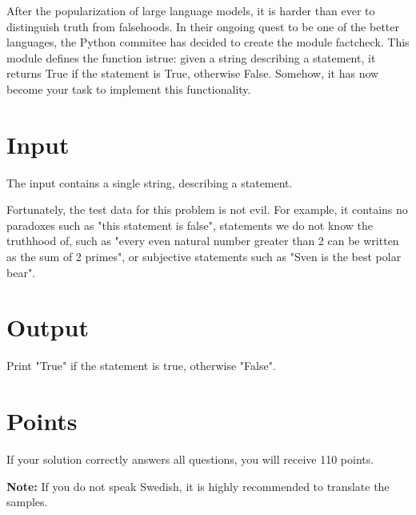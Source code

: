 \noindent

After the popularization of large language models, it is harder than ever to distinguish
truth from falsehoods. In their ongoing quest to be one of the better languages,
the Python commitee has decided to create the module factcheck. This module defines
the function istrue: given a string describing a statement, it returns True if the
statement is True, otherwise False. Somehow, it has now become your task to implement
this functionality.

\section*{Input}
\noindent
The input contains a single string, describing a statement.

Fortunately, the test data for this problem is not evil. For example, it contains no paradoxes such as
"this statement is false", statements we do not know the truthhood of, such as "every even
natural number greater than 2 can be written as the sum of 2 primes", or subjective statements
such as "Sven is the best polar bear".

\section*{Output}
\noindent
Print "True" if the statement is true, otherwise "False".

\section*{Points}
If your solution correctly answers all questions, you will receive 110 points.

\textbf{Note:} If you do not speak Swedish, it is highly recommended to translate the samples.
